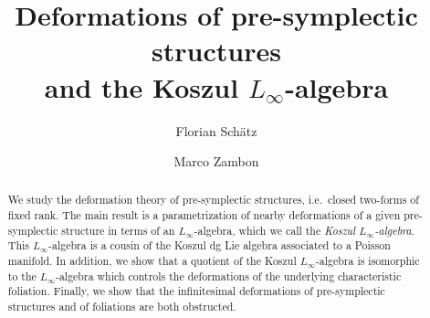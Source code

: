 \documentclass[11pt,thmsa]{amsart}
\theoremstyle{definition}
\begin{document}
 
 
\author{Florian Sch\"atz}
\address{University of Luxembourg, Mathematics Research Unit, 
Maison du Nombre
6, avenue de la Fonte 
L-4364 Esch-sur-Alzette, Luxembourg.
}
  
 \author{Marco Zambon}
\address{KU Leuven, Department of Mathematics, Celestijnenlaan 200B box 2400, BE-3001 Leuven, Belgium.}
   
  
  



 \title[Deformations of pre-symplectic structures and the Koszul $L_{\infty}$ algebra]{Deformations of pre-symplectic structures \\
 and the Koszul $L_{\infty}$-algebra}


 
 \begin{abstract}
We study the deformation theory of pre-symplectic structures, i.e.~closed two-forms of fixed rank.
The main result is a parametrization of nearby deformations of a given pre-symplectic structure in terms
of an $L_\infty$-algebra, which we call the {\em Koszul $L_\infty$-algebra}.
This $L_\infty$-algebra is a cousin of the Koszul dg Lie algebra
associated to a Poisson manifold. In addition, we show that a quotient of the Koszul $L_{\infty}$-algebra
is isomorphic to the $L_\infty$-algebra which controls the deformations of the underlying characteristic foliation. Finally, we show that the infinitesimal deformations of pre-symplectic structures and of foliations are both obstructed.
\end{abstract}





\maketitle
\end{document}
